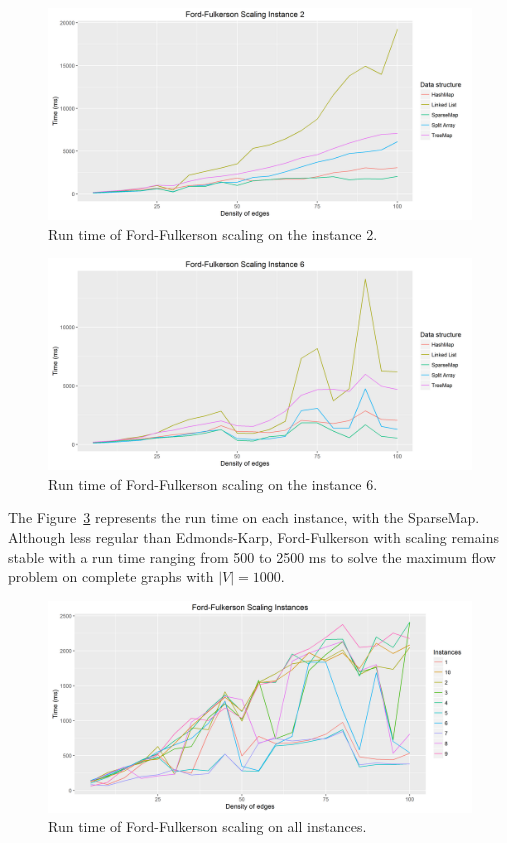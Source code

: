 \begin{figure}[H]
\includegraphics[scale=0.5]{images/FF2.png}
\caption{Run time of Ford-Fulkerson scaling on the instance 2.}
\label{fig:FF2}
\end{figure}
\begin{figure}[H]
\includegraphics[scale=0.5]{images/FF6.png}
\caption{Run time of Ford-Fulkerson scaling on the instance 6.}
\label{fig:FF6}
\end{figure}

The Figure~\ref{fig:FFmean} represents the run time on each instance, with the SparseMap. Although less regular than Edmonds-Karp, Ford-Fulkerson with scaling remains stable with a run time ranging from 500 to 2500 ms to solve the maximum flow problem on complete graphs with $|V|=1000$.

\begin{figure}[H]
\includegraphics[scale=0.5]{images/FFmean.png}
\caption{Run time of Ford-Fulkerson scaling on all instances.}
\label{fig:FFmean}
\end{figure}

